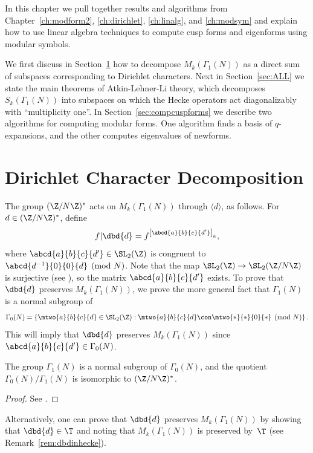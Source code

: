 In this chapter we pull together results and algorithms from
Chapter~\ref{ch:modform2}, \ref{ch:dirichlet}, \ref{ch:linalg}, and
\ref{ch:modsym} and explain how to use linear algebra techniques to
compute cusp forms and eigenforms using modular symbols.

We first discuss in Section~\ref{sec:decompdirchar} how to decompose
$M_k(\Gamma_1(N))$ as a direct sum of subspaces corresponding to
Dirichlet characters.  Next in Section~\ref{sec:ALL} we state the main
theorems of Atkin-Lehner-Li theory, which 
decomposes $S_k(\Gamma_1(N))$ into subspaces on which the
Hecke operators act diagonalizably with ``multiplicity one''.
In Section~\ref{sec:compcuspforms} we describe two
algorithms for computing modular forms. One algorithm finds
a basis of $q$-expansions, and the other computes eigenvalues
of newforms. 

\section{Dirichlet Character Decomposition}
\label{sec:decompdirchar}
The group $(\Z/N\Z)^*$ acts on $M_k(\Gamma_1(N))$ through 
 $\langle d \rangle$, as follows.
For $d\in(\Z/N\Z)^*$, define
$$
   f|\dbd{d} = f^{\left[\abcd{a}{b}{c}{d'}\right]_k},
$$
where $\abcd{a}{b}{c}{d'} \in \SL_2(\Z)$ is congruent to
$\abcd{d^{-1}}{0}{0\hfill }{d}\pmod{N}$.  Note that the map
$\SL_2(\Z)\to \SL_2(\Z/N\Z)$ is surjective (see ),
so the matrix $\abcd{a}{b}{c}{d'}$ exists.
To prove that $\dbd{d}$ preserves $M_k(\Gamma_1(N))$,
we prove the more general fact that $\Gamma_1(N)$ is a 
normal subgroup of
$$  \Gamma_0(N) = \left\{ \mtwo{a}{b}{c}{d} \in \SL_2(\Z) : 
                    \mtwo{a}{b}{c}{d}\con \mtwo{*}{*}{0}{*}\pmod{N}
                \right\}.
$$
This will imply that $\dbd{d}$ preserves $M_k(\Gamma_1(N))$
since $\abcd{a}{b}{c}{d'} \in \Gamma_0(N)$.

\begin{lemma}
The group $\Gamma_1(N)$ is a normal subgroup of $\Gamma_0(N)$,
and the quotient $\Gamma_0(N)/\Gamma_1(N)$ is
isomorphic to $(\Z/N\Z)^*$.
\end{lemma}
\begin{proof}
See .
\end{proof}

Alternatively, one can prove that $\dbd{d}$ preserves
$M_k(\Gamma_1(N))$ by showing that $\dbd{d}\in \T$ and noting that
$M_k(\Gamma_1(N))$ is preserved by~$\T$ (see
Remark~\ref{rem:dbdinhecke}).

